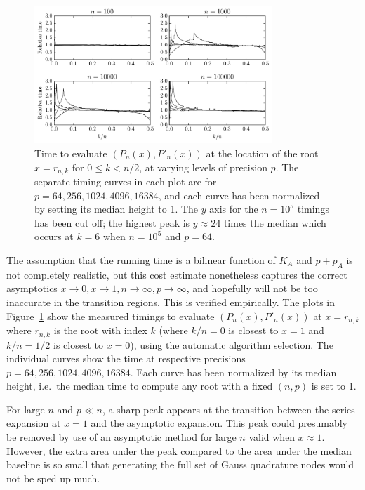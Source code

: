\documentclass[11pt,a4paper]{article}
\begin{document}
\begin{figure}[h!]
\begin{centering}
\includegraphics[width=0.8\textwidth]{timeplot}
\caption{Time to evaluate $(P_n(x), P'_n(x))$ at the location of the root $x = r_{n,k}$ for $0 \le k < n/2$, at varying levels of precision $p$.
The separate timing curves in each plot are for $p = 64, 256, 1024, 4096, 16384$, and each curve has been normalized by setting its median height to 1. The $y$ axis for the $n = 10^5$ timings has been cut off; the highest peak is $y \approx 24$ times the median which occurs at $k = 6$ when $n = 10^5$ and $p = 64$.}
\label{fig:timeplot}
\end{centering}
\end{figure}

The assumption that the running time is a bilinear function of $K_A$ and $p + p_A$ is not completely realistic, but this cost estimate nonetheless captures the correct asymptotics $x \to 0, x \to 1, n \to \infty, p \to \infty$, and hopefully will not be too inaccurate in the transition regions. This is verified empirically. The plots in Figure~\ref{fig:timeplot} show the measured timings to evaluate $(P_n(x), P'_n(x))$ at $x = r_{n,k}$ where $r_{n,k}$ is the root with index $k$ (where $k/n = 0$ is closest to $x = 1$ and $k/n = 1/2$ is closest to $x = 0$), using the automatic algorithm selection. The individual curves show the time at respective precisions $p = 64, 256, 1024, 4096, 16384$. Each curve has been normalized by its median height, i.e.\ the median time to compute any root with a fixed $(n,p)$ is set to 1.

For large $n$ and $p \ll n$, a sharp peak appears at the transition between the series expansion at $x = 1$ and the asymptotic expansion. This peak could presumably be removed by use of an asymptotic method for large $n$ valid when $x \approx 1$. However, the extra area under the peak compared to the area under the median baseline is so small that generating the full set of Gauss quadrature nodes would not be sped up much.
\end{document}
